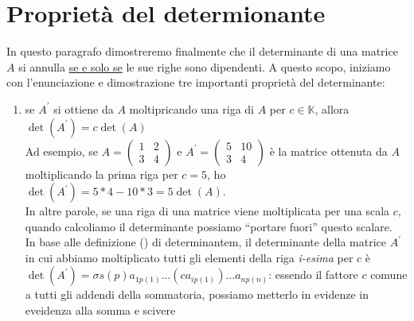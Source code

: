\documentclass{book}
\begin{document}
\section{Proprietà del determionante}
In questo paragrafo dimostreremo finalmente che il determinante di una matrice $A$ si annulla \underline{se e solo se} le sue righe sono dipendenti. A questo scopo, iniziamo con l'enunciazione e dimostrazione tre importanti proprietà del determinante:
\begin{enumerate}
\item se $A^\prime$ si ottiene da $A$ moltipricando una riga di $A$ per $c\in \mathds{K}$, allora $\det(A^\prime)=c\det(A)$\\
  Ad esempio, se $A=\begin{pmatrix} 1 & 2 \\ 3 & 4 \end{pmatrix}$ e $A^\prime =\begin{pmatrix} 5 & 10 \\ 3 &4 \end{pmatrix}$ è la matrice ottenuta da $A$ moltiplicando la prima riga per $c=5$, ho $\det(A^\prime)=5*4-10*3=5\det (A)$.\\
  In altre parole, se una riga di una matrice viene moltiplicata per una scala $c$, quando calcoliamo il determinante possiamo ``portare fuori'' questo scalare.\\
  In base alle definizione ({\it <++>}) di determinantem, il determinante della matrice $A^\prime$ in cui abbiamo moltiplicato tutti gli elementi della riga \textit{i-esima} per $c$ è $\det (A^\prime)=\sigma s(p)a_{1p(1)}\dots(ca_{ip(1)})\dots a_{np(n)}$: essendo il fattore $c$ comune a tutti gli addendi della sommatoria, possiamo metterlo in evidenze in eveidenza alla somma e scivere 
\end{enumerate}

\printindex
\end{document}
